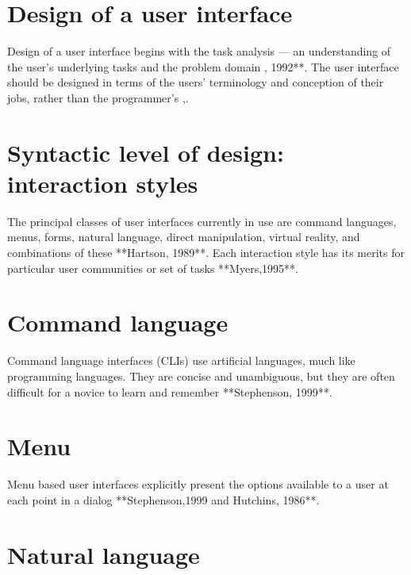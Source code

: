 \documentclass[english]{article}
\title{}
\author{Johannes Akse}
\begin{document}
\maketitle{}

\tableofcontents
\nocite{*}
\section{Design of a user interface}

Design of a user interface begins with the task analysis --- an
understanding of the user's underlying tasks and the problem 
domain \parencite{shneiderman1992}, 1992**. The user interface should be 
designed in terms of the users' terminology and conception of 
their jobs, rather than the programmer's \parencite{shneiderman1983}\parencite{stephenson1999,hutchins1986},.

\section{Syntactic level of design: interaction styles}

The principal classes of user interfaces currently in use are
command languages, menus, forms, natural language, direct manipulation,
virtual reality, and combinations of these **Hartson, 1989**. Each
interaction style has its merits for particular user communities or
set of tasks **Myers,1995**.

\section{Command language}

Command language interfaces (CLIs) use artificial languages,
much like programming languages. They are concise and unambiguous, 
but they are often difficult for a novice to learn and remember 
**Stephenson, 1999**.

\section{Menu}

Menu based user interfaces explicitly present the options available to
a user at each point in a dialog **Stephenson,1999 and Hutchins,
1986**. 

\section{Natural language}
\end{document}
